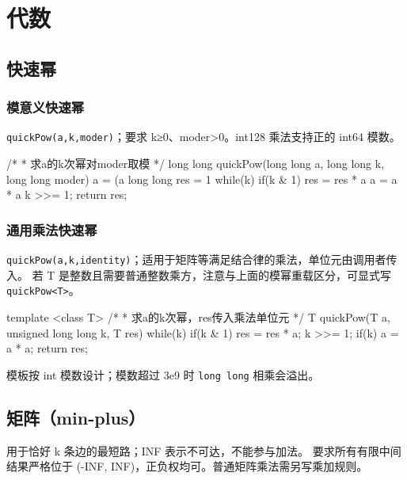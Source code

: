\chapter{代数}

\section{快速幂}
\subsection{模意义快速幂}\label{ux6a21ux610fux4e49ux5febux901fux5e42}

\texttt{quickPow(a,k,moder)}；要求 k≥0、moder\textgreater0。int128 乘法支持正的 int64 模数。


\begin{codeline}
/*
 * 求a的k次幂对moder取模
 */
long long quickPow(long long a, long long k, long long moder) {
    a = (a %
    long long res = 1 %
    while(k) {
        if(k & 1) {
            res = res * a %
        }
        a = a * a %
        k >>= 1;
    }
    return res;
}
\end{codeline}


\subsection{通用乘法快速幂}\label{ux901aux7528ux4e58ux6cd5ux5febux901fux5e42}

\texttt{quickPow(a,k,identity)}；适用于矩阵等满足结合律的乘法，单位元由调用者传入。 若 T 是整数且需要普通整数乘方，注意与上面的模幂重载区分，可显式写 \texttt{quickPow\textless{}T\textgreater{}}。


\begin{codeline}
template <class T>
/*
 * 求a的k次幂，res传入乘法单位元
 */
T quickPow(T a, unsigned long long k, T res) {
    while(k) {
        if(k & 1) {
            res = res * a;
        }
        k >>= 1;
        if(k) {
            a = a * a;
        }
    }
    return res;
}
\end{codeline}
\begin{warnbox}
模板按 int 模数设计；模数超过 3e9 时 \texttt{long long} 相乘会溢出。
\end{warnbox}

\section{矩阵（min-plus）}
用于恰好 k 条边的最短路；INF 表示不可达，不能参与加法。 要求所有有限中间结果严格位于 (-INF, INF)，正负权均可。普通矩阵乘法需另写乘加规则。


